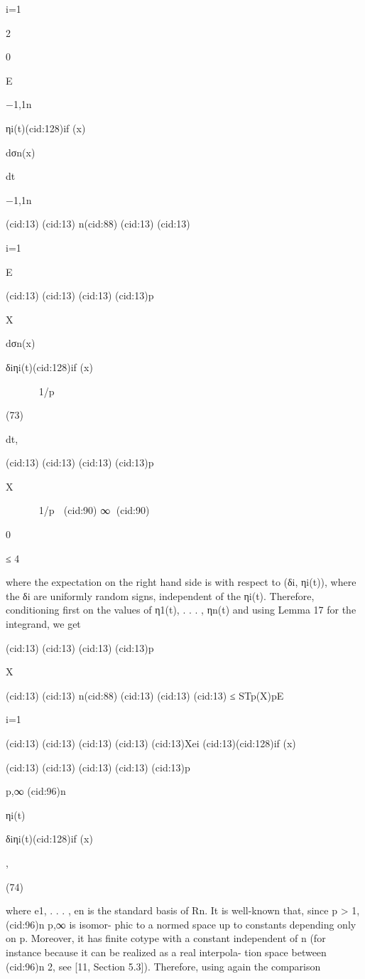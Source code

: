 {i=1

2

0

E

{−1,1}n

ηi(t)(cid:128)if (x)

dσn(x)

dt

{−1,1}n

(cid:13)
(cid:13) n(cid:88)
(cid:13)
(cid:13)

i=1

E

(cid:13)
(cid:13)
(cid:13)
(cid:13)p

X

dσn(x)

δiηi(t)(cid:128)if (x)






1/p

(73)

dt,

(cid:13)
(cid:13)
(cid:13)
(cid:13)p

X






1/p

(cid:90) ∞
(cid:90)





0

≤ 4

where the expectation on the right hand side is with respect to (δi, ηi(t)), where the δi are
uniformly random signs, independent of the ηi(t). Therefore, conditioning ﬁrst on the values
of η1(t), . . . , ηn(t) and using Lemma 17 for the integrand, we get

(cid:13)
(cid:13)
(cid:13)
(cid:13)p

X

(cid:13)
(cid:13) n(cid:88)
(cid:13)
(cid:13)
(cid:13)
≤ STp(X)pE

i=1

(cid:13)
(cid:13)
(cid:13)
(cid:13)
(cid:13)Xei
(cid:13)(cid:128)if (x)

(cid:13)
(cid:13)
(cid:13)
(cid:13)
(cid:13)p

p,∞
(cid:96)n

ηi(t)

δiηi(t)(cid:128)if (x)

,

(74)

where {e1, . . . , en} is the standard basis of Rn. It is well-known that, since p > 1, (cid:96)n
p,∞ is isomor-
phic to a normed space up to constants depending only on p. Moreover, it has ﬁnite cotype
with a constant independent of n (for instance because it can be realized as a real interpola-
tion space between (cid:96)n
2, see [11, Section 5.3]). Therefore, using again the comparison

}
